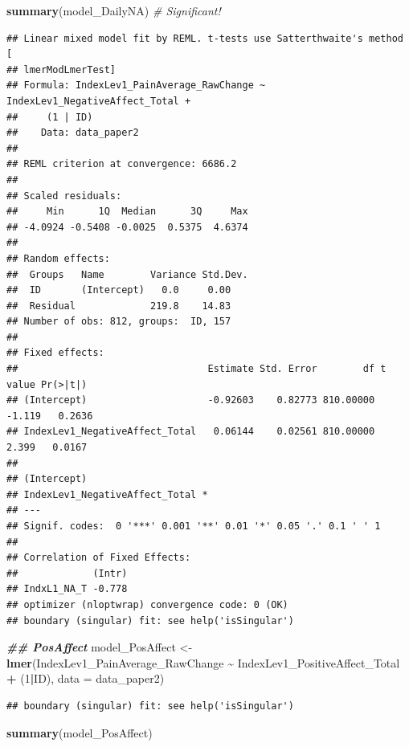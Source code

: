 \documentclass[
  12pt,
]{article}
\newenvironment{Shaded}{\begin{snugshade}}{\end{snugshade}}
\newcommand{\AttributeTok}[1]{\textcolor[rgb]{0.13,0.29,0.53}{#1}}
\newcommand{\CommentTok}[1]{\textcolor[rgb]{0.56,0.35,0.01}{\textit{#1}}}
\newcommand{\DecValTok}[1]{\textcolor[rgb]{0.00,0.00,0.81}{#1}}
\newcommand{\DocumentationTok}[1]{\textcolor[rgb]{0.56,0.35,0.01}{\textbf{\textit{#1}}}}
\newcommand{\FunctionTok}[1]{\textcolor[rgb]{0.13,0.29,0.53}{\textbf{#1}}}
\newcommand{\NormalTok}[1]{#1}
\newcommand{\OtherTok}[1]{\textcolor[rgb]{0.56,0.35,0.01}{#1}}
\newcommand{\SpecialCharTok}[1]{\textcolor[rgb]{0.81,0.36,0.00}{\textbf{#1}}}
\begin{document}
\begin{Shaded}
\begin{Highlighting}[]
\FunctionTok{summary}\NormalTok{(model\_DailyNA) }\CommentTok{\# Significant!}
\end{Highlighting}
\end{Shaded}

\begin{verbatim}
## Linear mixed model fit by REML. t-tests use Satterthwaite's method [
## lmerModLmerTest]
## Formula: IndexLev1_PainAverage_RawChange ~ IndexLev1_NegativeAffect_Total +  
##     (1 | ID)
##    Data: data_paper2
## 
## REML criterion at convergence: 6686.2
## 
## Scaled residuals: 
##     Min      1Q  Median      3Q     Max 
## -4.0924 -0.5408 -0.0025  0.5375  4.6374 
## 
## Random effects:
##  Groups   Name        Variance Std.Dev.
##  ID       (Intercept)   0.0     0.00   
##  Residual             219.8    14.83   
## Number of obs: 812, groups:  ID, 157
## 
## Fixed effects:
##                                 Estimate Std. Error        df t value Pr(>|t|)
## (Intercept)                     -0.92603    0.82773 810.00000  -1.119   0.2636
## IndexLev1_NegativeAffect_Total   0.06144    0.02561 810.00000   2.399   0.0167
##                                 
## (Intercept)                     
## IndexLev1_NegativeAffect_Total *
## ---
## Signif. codes:  0 '***' 0.001 '**' 0.01 '*' 0.05 '.' 0.1 ' ' 1
## 
## Correlation of Fixed Effects:
##             (Intr)
## IndxL1_NA_T -0.778
## optimizer (nloptwrap) convergence code: 0 (OK)
## boundary (singular) fit: see help('isSingular')
\end{verbatim}

\begin{Shaded}
\begin{Highlighting}[]
\DocumentationTok{\#\# PosAffect}
\NormalTok{model\_PosAffect }\OtherTok{\textless{}{-}} \FunctionTok{lmer}\NormalTok{(IndexLev1\_PainAverage\_RawChange }\SpecialCharTok{\textasciitilde{}}\NormalTok{ IndexLev1\_PositiveAffect\_Total }\SpecialCharTok{+}\NormalTok{ (}\DecValTok{1}\SpecialCharTok{|}\NormalTok{ID), }\AttributeTok{data =}\NormalTok{ data\_paper2)}
\end{Highlighting}
\end{Shaded}

\begin{verbatim}
## boundary (singular) fit: see help('isSingular')
\end{verbatim}

\begin{Shaded}
\begin{Highlighting}[]
\FunctionTok{summary}\NormalTok{(model\_PosAffect)}
\end{Highlighting}
\end{Shaded}
\end{document}
